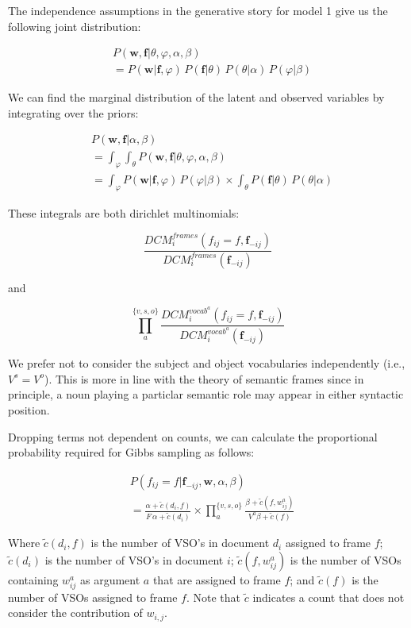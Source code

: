 \documentclass{article} %
\renewcommand\phi\varphi
\begin{document}
The independence assumptions in the generative story for model 1 give us the 
following joint distribution:

\begin{align*}
&P(\mathbf{w},\mathbf{f}|\theta,\phi,\alpha,\beta)\\
&=P(\mathbf{w}|\mathbf{f},\phi)\,P(\mathbf{f}|\theta)\,P(\theta|\alpha)\,P(\phi|\beta)
\end{align*}

We can find the marginal distribution of the latent and observed variables by
integrating over the priors:

\begin{align*}
& P(\mathbf{w},\mathbf{f}|\alpha,\beta)\\
&=\int_\phi\int_\theta P(\mathbf{w},\mathbf{f}|\theta,\phi,\alpha,\beta)\\
&=     \int_\phi P(\mathbf{w}|\mathbf{f},\phi )\,P(\phi|\beta)
\times \int_\theta P(\mathbf{f}|\theta)\,P(\theta|\alpha)
\end{align*}

These integrals are both dirichlet multinomials:

\[
\frac{DCM_i^{frames}(f_{ij}=f, \mathbf{f}_{-ij})}{DCM_i^{frames}(\mathbf{f}_{-ij})}
\]

and

\[
\prod_a^{\{v,s,o\}}\frac{DCM_i^{vocab^a}(f_{ij}=f, \mathbf{f}_{-ij})}{DCM_i^{vocab^a}(\mathbf{f}_{-ij})}
\]

We prefer not to consider the subject and object vocabularies independently 
(i.e., $V^s = V^o$). This is more in line with the theory of semantic frames 
since in principle, a noun playing a particlar semantic role may appear in either 
syntactic position.

Dropping terms not dependent on counts, we can calculate the proportional
probability required for Gibbs sampling as follows:

\begin{align}
& P(f_{ij} = f|\mathbf{f}_{-ij},\mathbf{w}, \alpha,\beta)\nonumber\\
&=\frac{\alpha + \tilde c(d_i,f)}{F\,\alpha + \tilde c(d_i)}
\times \prod_a^{\{v,s,o\}}\frac{\beta+\tilde c(f,w_{ij}^a)}{V^a\beta+\tilde c(f)}
\end{align}

Where $\tilde c (d_i, f)$ is the number of VSO's in document $d_i$ assigned to frame $f$;
$\tilde c(d_i)$ is the number of VSO's in document $i$;
$\tilde c(f,w_{ij}^a)$ is the number of VSOs containing $w_{ij}^a$ as argument $a$ that are
assigned to frame $f$; and
$\tilde c(f)$ is the number of VSOs assigned to frame $f$.
Note that $\tilde c$ indicates a count that does not consider the contribution of 
$w_{i,j}$.
\end{document}

